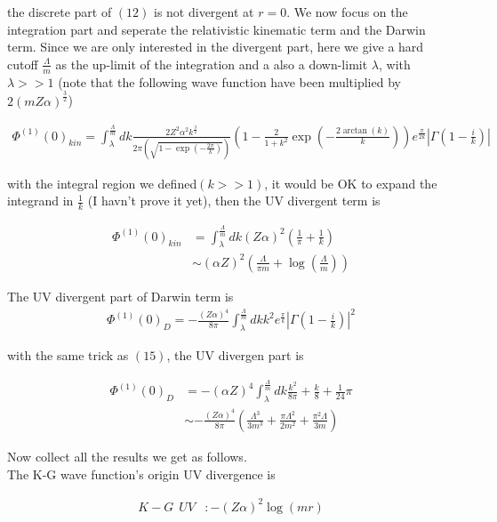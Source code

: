 \documentclass{article}
\begin{document}
the discrete part of $(12)$ is not divergent at $r=0$. We now focus on the integration part and seperate the relativistic kinematic term and the Darwin term. Since we are only interested in the divergent part, here we give a hard cutoff $\frac{\Lambda}{m}$ as the up-limit of the integration and a also a down-limit $\lambda$, with $\lambda>>1$ (note that the following wave function have been multiplied by $2(mZ\alpha)^\frac{3}{2}$)

\begin{align}
	\Phi^{(1)}(0)_{kin}=\int_\lambda^\frac{\Lambda}{m}dk \frac{2Z^2\alpha^2k^\frac{3}{2}}{2\pi(\sqrt{1-\exp(-\frac{2 \pi}{k})})}(1-\frac{2}{1+k^2}\exp(-\frac{2\arctan(k)}{k}))e^\frac{\pi}{2k}|\Gamma(1-\frac{i}{k})|
\end{align}

with the integral region we defined$(k>>1)$, it would be OK to expand the integrand in $\frac{1}{k}$ (I havn't prove it yet), then the UV divergent term is

\begin{align}
	\Phi^{(1)}(0)_{kin} & =\int_\lambda^\frac{\Lambda}{m}dk(Z\alpha)^2(\frac{1}{\pi}+\frac{1}{k}) \\
	                    & \sim(\alpha Z)^2(\frac{\Lambda}{\pi m}+\log(\frac{\Lambda}{m}))
\end{align}

The UV divergent part of Darwin term is
\begin{align}
	\Phi^{(1)}(0)_D=-\frac{(Z\alpha)^4}{8\pi}\int_\lambda^\frac{\Lambda}{m}dkk^2e^\frac{\pi}{k}|\Gamma(1-\frac{i}{k})|^2
\end{align}

with the same trick as $(15)$, the UV divergen part is

\begin{align}
	\Phi^{(1)}(0)_{D} & =-(\alpha Z)^4\int_\lambda^\frac{\Lambda}{m}dk\frac{k^2}{8\pi}+\frac{k}{8}+\frac{1}{24}\pi               \\
	                  & \sim -\frac{(Z\alpha)^4}{8\pi}(\frac{\Lambda^3}{3m^3}+\frac{\pi\Lambda^2}{2m^2}+\frac{\pi^2\Lambda}{3m})
\end{align}

Now collect all the results we get as follows.\\
The K-G wave function's origin UV divergence is

\begin{align}
	K-G\ \ UV & :-(Z\alpha)^2\log(m r)
\end{align}
\end{document}
